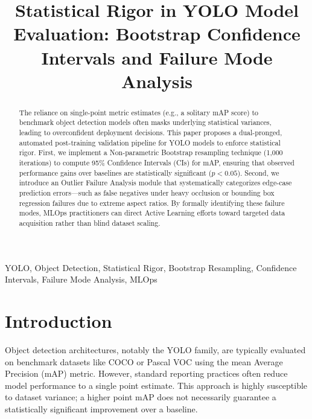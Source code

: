 \documentclass[conference]{IEEEtran}
\begin{document}
\title{Statistical Rigor in YOLO Model Evaluation: Bootstrap Confidence Intervals and Failure Mode Analysis}

\author{
}

\maketitle

\begin{abstract}
The reliance on single-point metric estimates (e.g., a solitary mAP score) to benchmark object detection models often masks underlying statistical variances, leading to overconfident deployment decisions. This paper proposes a dual-pronged, automated post-training validation pipeline for YOLO models to enforce statistical rigor. First, we implement a Non-parametric Bootstrap resampling technique (1,000 iterations) to compute 95\% Confidence Intervals (CIs) for mAP, ensuring that observed performance gains over baselines are statistically significant ($p < 0.05$). Second, we introduce an Outlier Failure Analysis module that systematically categorizes edge-case prediction errors—such as false negatives under heavy occlusion or bounding box regression failures due to extreme aspect ratios. By formally identifying these failure modes, MLOps practitioners can direct Active Learning efforts toward targeted data acquisition rather than blind dataset scaling.
\end{abstract}

\begin{IEEEkeywords}
YOLO, Object Detection, Statistical Rigor, Bootstrap Resampling, Confidence Intervals, Failure Mode Analysis, MLOps
\end{IEEEkeywords}

\section{Introduction}
Object detection architectures, notably the YOLO family, are typically evaluated on benchmark datasets like COCO or Pascal VOC using the mean Average Precision (mAP) metric. However, standard reporting practices often reduce model performance to a single point estimate. This approach is highly susceptible to dataset variance; a higher point mAP does not necessarily guarantee a statistically significant improvement over a baseline.
\end{document}
